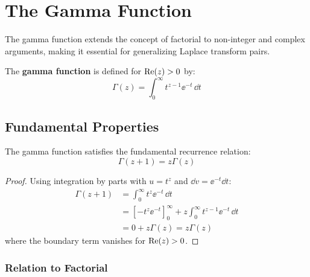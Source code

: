 

\section{The Gamma Function}

The gamma function extends the concept of factorial to non-integer and complex arguments, making it essential for generalizing Laplace transform pairs.

\begin{definitionbox}[title=Definition 10.7: Gamma Function]
The \textbf{gamma function} is defined for $\operatorname{Re}(z) > 0$ by:
\begin{equation}
\Gamma(z) = \int_0^\infty t^{z-1}\ee^{-t} \, \dd t
\end{equation}
\end{definitionbox}



\subsection{Fundamental Properties}

\begin{keyconceptbox}[title=Gamma Function Recurrence]
The gamma function satisfies the fundamental recurrence relation:
\begin{equation}
\boxed{\Gamma(z+1) = z\Gamma(z)}
\end{equation}
\end{keyconceptbox}

\begin{proof}
Using integration by parts with $u = t^z$ and $\dd v = \ee^{-t}\dd t$:
\begin{align}
\Gamma(z+1) &= \int_0^\infty t^z \ee^{-t} \, \dd t \\
&= \left[-t^z\ee^{-t}\right]_0^\infty + z\int_0^\infty t^{z-1}\ee^{-t} \, \dd t \\
&= 0 + z\Gamma(z) = z\Gamma(z)
\end{align}
where the boundary term vanishes for $\operatorname{Re}(z) > 0$.
\end{proof}

\subsubsection{Relation to Factorial}

